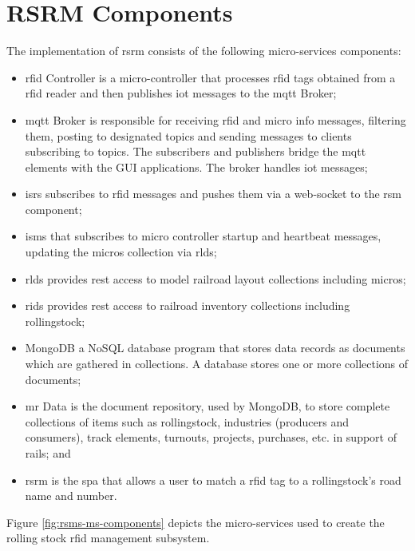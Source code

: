 \section{RSRM Components}
The implementation of \gls{rsrm} consists of the following micro-services components:
\begin{itemize}
\item \gls{rfid} Controller is a micro-controller that processes \gls{rfid} tags obtained from a \gls{rfid} reader and then publishes \gls{iot} messages to the \gls{mqtt} Broker;
\item \gls{mqtt} Broker is responsible for receiving \gls{rfid} and micro info messages, filtering them, posting to designated topics and sending messages to clients subscribing to topics. The subscribers and publishers bridge the \gls{mqtt} elements with the GUI applications. The broker handles \gls{iot} messages;
\item \gls{isrs} subscribes to \gls{rfid} messages and pushes them via a web-socket to the rsm component;
\item \gls{isms} that subscribes to micro controller startup and heartbeat messages, updating the micros collection via \gls{rlds};
\item \gls{rlds} provides \gls{rest} access to model railroad layout collections including micros;
\item \gls{rids} provides \gls{rest} access to railroad inventory collections including rollingstock;
\item MongoDB a NoSQL database program that stores data records as documents which are gathered in collections. A database stores one or more collections of documents;
\item \gls{mr} Data is the document repository, used by MongoDB, to store complete collections of items such as rollingstock, industries (producers and consumers), track elements, turnouts, projects, purchases, etc. in support of \gls{rails}; and
\item \gls{rsrm} is the \gls{spa} that allows a user to match a \gls{rfid} tag to a rollingstock's road name and number.
\end{itemize}
Figure \ref{fig:rsms-ms-components} depicts the micro-services used to create the rolling stock \gls{rfid} management subsystem.

